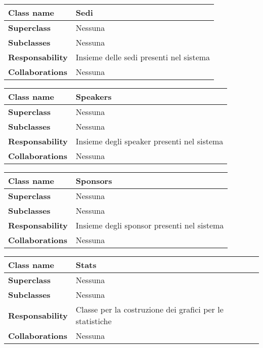 \begin{table}[h!]
	\begin{tabular}{|l|l|}
		\hline 
		\textbf{Class name} & Sedi
		\\ \hline
		\textbf{Superclass} & Nessuna
		\\ \hline
		\multirow{1}{*}{\textbf{Subclasses}} & Nessuna
		\\ \hline
		\textbf{Responsability} & Insieme delle sedi presenti nel sistema
		\\ \hline
		\multirow{1}{*}{\textbf{Collaborations}} & Nessuna
		\\ \hline
	\end{tabular}
\end{table}

\begin{table}[h!]
	\begin{tabular}{|l|l|}
		\hline 
		\textbf{Class name} & Speakers
		\\ \hline
		\textbf{Superclass} & Nessuna
		\\ \hline
		\multirow{1}{*}{\textbf{Subclasses}} & Nessuna
		\\ \hline
		\textbf{Responsability} & Insieme degli speaker presenti nel sistema
		\\ \hline
		\multirow{1}{*}{\textbf{Collaborations}} & Nessuna
		\\ \hline
	\end{tabular}
\end{table}

\begin{table}[h!]
	\begin{tabular}{|l|l|}
		\hline 
		\textbf{Class name} & Sponsors
		\\ \hline
		\textbf{Superclass} & Nessuna
		\\ \hline
		\multirow{1}{*}{\textbf{Subclasses}} & Nessuna
		\\ \hline
		\textbf{Responsability} & Insieme degli sponsor presenti nel sistema
		\\ \hline
		\multirow{1}{*}{\textbf{Collaborations}} & Nessuna
		\\ \hline
	\end{tabular}
\end{table}

\begin{table}[h!]
	\begin{tabular}{|l|l|}
		\hline 
		\textbf{Class name} & Stats
		\\ \hline
		\textbf{Superclass} & Nessuna
		\\ \hline
		\multirow{1}{*}{\textbf{Subclasses}} & Nessuna
		\\ \hline
		\textbf{Responsability} & Classe per la costruzione dei grafici per le statistiche
		\\ \hline
		\multirow{1}{*}{\textbf{Collaborations}} & Nessuna
		\\ \hline
	\end{tabular}
\end{table}

